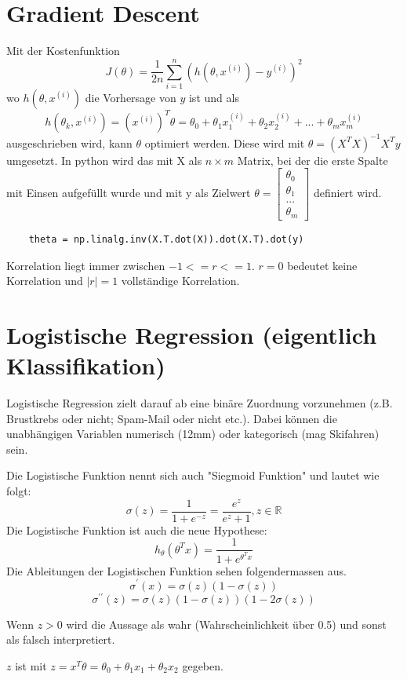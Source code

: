 \documentclass{article}
\begin{document}
\section{Gradient Descent}
	Mit der Kostenfunktion $$J(\theta) = \frac{1}{2 n} \sum_{i=1}^{n}(h(\theta,x^{(i)})-y^{(i)})^2$$ wo $h(\theta,x^{(i)})$ die Vorhersage von $y$ ist und als $$h(\theta_k,x^{(i)})= (x^{(i)})^T\theta=\theta_0+\theta_1x_1^{(i)}+\theta_2x_2^{(i)}+...+\theta_mx_m^{(i)}$$
	ausgeschrieben wird, kann $\theta$ optimiert werden.	
	Diese wird mit $\theta = (X^T X)^{-1} X^T y$ umgesetzt. 
	In python wird das mit X als $n \times m$ Matrix, bei der die erste Spalte mit Einsen aufgefüllt wurde und mit y als Zielwert
	$\theta = 
	\begin{bmatrix}
	\theta_0 \\[0.1pt] \theta_1 \\[0.1pt] ... \\[0.1pt] \theta_m
	\end{bmatrix}$ definiert wird.
	
	\begin{lstlisting}
	theta = np.linalg.inv(X.T.dot(X)).dot(X.T).dot(y)
	\end{lstlisting}
	
	Korrelation liegt immer zwischen $-1 <= r <= 1$.
	$r = 0$ bedeutet keine Korrelation und $|r| = 1$ vollständige Korrelation.
\section{Logistische Regression (eigentlich Klassifikation)}
	Logistische Regression zielt darauf ab eine binäre Zuordnung vorzunehmen (z.B. Brustkrebs oder nicht; Spam-Mail oder nicht etc.).
	Dabei können die unabhängigen Variablen numerisch (12mm) oder kategorisch (mag Skifahren) sein.
	
	Die Logistische Funktion nennt sich auch "Siegmoid Funktion" und lautet wie folgt:
	$$\sigma(z) = \frac{1}{1+e^{-z}} = \frac{e^z}{e^z+1}, z \in \mathbb{R}$$
	Die Logistische Funktion ist auch die neue Hypothese: $$h_\theta(\theta^Tx)=\frac{1}{1+e^{\theta^Tx}}$$
	Die Ableitungen der Logistischen Funktion sehen folgendermassen aus.
	$$\sigma^{\prime}(x) = \sigma(z) (1-\sigma(z))$$
	$$\sigma^{\prime\prime}(z)= \sigma(z)(1-\sigma(z))(1-2\sigma(z))$$
	
	Wenn $z > 0$ wird die Aussage als wahr (Wahrscheinlichkeit über 0.5) und sonst als falsch interpretiert.
	
	$z$ ist mit $z=x^T \theta = \theta_0 + \theta_1 x_1 + \theta_2 x_2$ gegeben.
\end{document}
